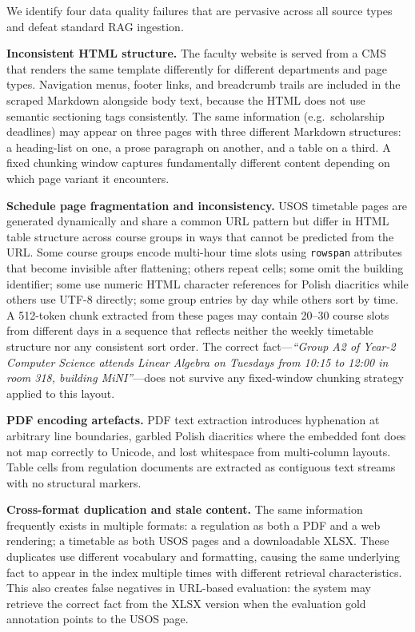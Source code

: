 \documentclass[sigconf,natbib=true]{acmart}
\begin{document}
We identify four data quality failures that are pervasive across all source types and defeat standard RAG ingestion.

\textbf{Inconsistent HTML structure.}
The faculty website is served from a CMS that renders the same template differently for different departments and page types.
Navigation menus, footer links, and breadcrumb trails are included in the scraped Markdown alongside body text, because the HTML does not use semantic sectioning tags consistently.
The same information (e.g.\ scholarship deadlines) may appear on three pages with three different Markdown structures: a heading-list on one, a prose paragraph on another, and a table on a third.
A fixed chunking window captures fundamentally different content depending on which page variant it encounters.

\textbf{Schedule page fragmentation and inconsistency.}
USOS timetable pages are generated dynamically and share a common URL pattern but differ in HTML table structure across course groups in ways that cannot be predicted from the URL.
Some course groups encode multi-hour time slots using \texttt{rowspan} attributes that become invisible after flattening; others repeat cells; some omit the building identifier; some use numeric HTML character references for Polish diacritics while others use UTF-8 directly; some group entries by day while others sort by time.
A 512-token chunk extracted from these pages may contain 20--30 course slots from different days in a sequence that reflects neither the weekly timetable structure nor any consistent sort order.
The correct fact---\textit{``Group A2 of Year-2 Computer Science attends Linear Algebra on Tuesdays from 10:15 to 12:00 in room 318, building MiNI''}---does not survive any fixed-window chunking strategy applied to this layout.

\textbf{PDF encoding artefacts.}
PDF text extraction introduces hyphenation at arbitrary line boundaries, garbled Polish diacritics where the embedded font does not map correctly to Unicode, and lost whitespace from multi-column layouts.
Table cells from regulation documents are extracted as contiguous text streams with no structural markers.

\textbf{Cross-format duplication and stale content.}
The same information frequently exists in multiple formats: a regulation as both a PDF and a web rendering; a timetable as both USOS pages and a downloadable XLSX.
These duplicates use different vocabulary and formatting, causing the same underlying fact to appear in the index multiple times with different retrieval characteristics.
This also creates false negatives in URL-based evaluation: the system may retrieve the correct fact from the XLSX version when the evaluation gold annotation points to the USOS page.
\end{document}
